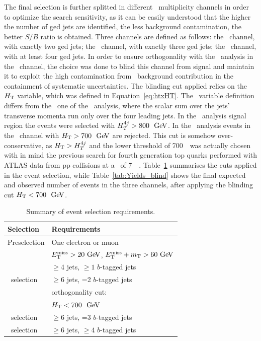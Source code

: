 The final selection is further splitted in different \bjet\ multiplicity 
channels in order to optimize the search sensitivity, as it can be
easily understood that the higher the number of \btag ged jets are
identified, the less background contamination, 
the better $S/B$ ratio is obtained. Three channels are
defined as follows: the \chii\ channel, with exactly two \btag ged jets;
the \chiii\ channel, with exactly three \btag ged jets;
the \chiv\ channel, with at least four \btag ged jets.
In order to ensure orthogonality with the \wbx\ analysis
in the \chii\ channel, the choice was done to blind this channel
from signal and maintain it to exploit the high contamination from
\ttbar\ background contribution in the containment of systematic
uncertainties. The blinding cut applied relies on the $\HT$ variable,
which was defined in Equation~\ref{eq:htxHT}.
The \HT\ variable definition differs from the \htfj\ one of the \wbx\ analysis,
where the scalar sum over the jets' transverse momenta run only
over the four leading jets. In the \wbx\ analysis signal region the 
events were selected with $\htfj > 800~\gev$. In the \htx\ 
analysis events in the \chii\ channel with $\HT > 700~\gev$
are rejected. This cut is somehow over-conservative, as $\HT>\htfj$
and the lower threshold of 700~\gev\ was actually chosen with in mind
the previous search for fourth generation top quarks performed with
ATLAS data from pp collisions at a \cme\ of 7~\tev~\cite{ATLAS:2012qe}.
Table~\ref{tab:htxselection} summarises the cuts applied in the event selection,
while Table~\ref{tab:Yields_blind} shows the final expected and
observed number of events in the three channels, after applying 
the blinding cut $\HT < 700~\gev$.

\begin{table}[tb]
\begin{center}
\begin{tabular}{ll}
\toprule
Selection & Requirements \\
\midrule
Preselection & One electron or muon  \\
             & $\met >20\gev$, $\met +m_{\rm T}>60\gev$ \\
             & $\geq 4$ jets, $\geq 1$ $b$-tagged jets \\
\midrule
\chii\ selection & $\geq 6$ jets, =2 $b$-tagged jets \\
 & orthogonality cut: \\
 & $\HT < 700~\gev$ \\
\midrule
\chiii\ selection & $\geq 6$ jets,  =3 $b$-tagged jets \\
\midrule
\chiv\ selection &$\geq 6$ jets,  $\geq 4$ $b$-tagged jets \\
\bottomrule
\end{tabular}
\caption{Summary of event selection requirements.}
\label{tab:htxselection}
\end{center}
\end{table}

